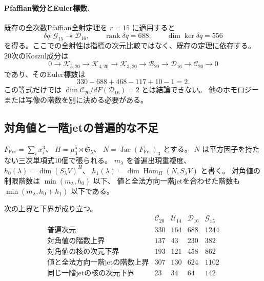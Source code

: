 \paragraph{Pfaffian微分とEuler標数.}
既存の全次数Pfaffian全射定理を $r=15$ に適用すると
\[
 \delta q:\mathcal G_{15}\twoheadrightarrow\mathcal D_{16},\qquad
 \operatorname{rank}\delta q=688,\qquad
 \dim\ker\delta q=556
\]
を得る。ここでの全射性は指標の次元比較ではなく、既存の定理に依存する。
20次のKoszul成分は
\[
0\longrightarrow\mathcal K_{5,20}\longrightarrow\mathcal K_{4,20}
 \longrightarrow\mathcal K_{3,20}\longrightarrow\mathcal B_{20}
 \longrightarrow\mathcal D_{16}\longrightarrow\mathcal C_{20}
 \longrightarrow0
\]
であり、そのEuler標数は
\[
 330-688+468-117+10-1=2.
\]
この等式だけでは $\dim\mathcal C_{20}/dF(\mathcal D_{16})=2$ とは結論できない。
他のホモロジーまたは写像の階数を別に決める必要がある。

\subsection{対角値と一階jetの普遍的な不足}

$F_{\mathrm{Fer}}=\sum_i x_i^3$、
$H=\mu_3^5\rtimes\mathfrak S_5$、
$N=\operatorname{Jac}(F_{\mathrm{Fer}})_3$ とする。
$N$ は平方因子を持たない三次単項式10個で張られる。
$m_\lambda$ を普遍出現重複度、
$h_0(\lambda)=\dim(S_\lambda V)^H$、
$h_1(\lambda)=\dim\operatorname{Hom}_H(N,S_\lambda V)$ と書く。
対角値の制限階数は $\min(m_\lambda,h_0)$ 以下、
値と全法方向一階jetを合わせた階数も $\min(m_\lambda,h_0+h_1)$ 以下である。

\begin{proposition}[20次の制限上界]\label{prop:v15-diagonal-visibility}
次の上界と下界が成り立つ。
\[
\begin{array}{c|rrrr}
&\mathcal C_{20}&\mathcal U_{14}&\mathcal D_{16}&\mathcal G_{15}\\\hline
\text{普遍次元}&330&164&688&1244\\
\text{対角値の階数上界}&137&43&230&382\\
\text{対角値の核の次元下界}&193&121&458&862\\
\text{値と全法方向一階jetの階数上界}&307&130&624&1102\\
\text{同じ一階jetの核の次元下界}&23&34&64&142
\end{array}
\]
\end{proposition}


